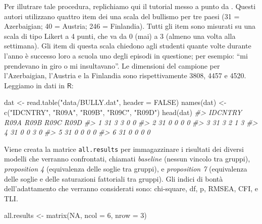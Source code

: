\documentclass[
  11pt,
]{krantz}
\makeatletter
\newenvironment{Shaded}{\begin{snugshade}}{\end{snugshade}}
\newcommand{\AttributeTok}[1]{\textcolor[rgb]{0.61,0.61,0.61}{#1}}
\newcommand{\CommentTok}[1]{\textcolor[rgb]{0.37,0.37,0.37}{\textit{#1}}}
\newcommand{\ConstantTok}[1]{\textcolor[rgb]{0,0,0}{#1}}
\newcommand{\DecValTok}[1]{\textcolor[rgb]{0.06,0.06,0.06}{#1}}
\newcommand{\FunctionTok}[1]{\textcolor[rgb]{0,0,0}{#1}}
\newcommand{\NormalTok}[1]{#1}
\newcommand{\OtherTok}[1]{\textcolor[rgb]{0.37,0.37,0.37}{#1}}
\newcommand{\StringTok}[1]{\textcolor[rgb]{0.5,0.5,0.5}{#1}}
\newenvironment{kframe}{%
\medskip{}
\setlength{\fboxsep}{.8em}
 \def\at@end@of@kframe{}%
 \ifinner\ifhmode%
  \def\at@end@of@kframe{\end{minipage}}%
  \begin{minipage}{\columnwidth}%
 \fi\fi%
 \def\FrameCommand##1{\hskip\@totalleftmargin \hskip-\fboxsep
 \colorbox{shadecolor}{##1}\hskip-\fboxsep
     \hskip-\linewidth \hskip-\@totalleftmargin \hskip\columnwidth}%
 \MakeFramed {\advance\hsize-\width
   \@totalleftmargin\z@ \linewidth\hsize
   \@setminipage}}%
 {\par\unskip\endMakeFramed%
 \at@end@of@kframe}
\renewenvironment{Shaded}{\begin{kframe}}{\end{kframe}}
\theoremstyle{definition}
\theoremstyle{definition}
\theoremstyle{definition}
\theoremstyle{definition}
\theoremstyle{remark}
\makeatother
\begin{document}
Per illutrare tale procedura, replichiamo qui il tutorial messo a punto da \citet{svetina2020multiple}. Questi autori utilizzano quattro item dei una scala del bullismo per tre paesi (31 = Azerbaigian; 40 = Austria; 246 = Finlandia). Tutti gli item sono misurati su una scala di tipo Likert a 4 punti, che va da 0 (mai) a 3 (almeno una volta alla settimana). Gli item di questa scala chiedono agli studenti quante volte durante l'anno è successo loro a scuola uno degli episodi in questione; per esempio: ``mi prendevano in giro o mi insultavano''. Le dimensioni del campione per l'Azerbaigian, l'Austria e la Finlandia sono rispettivamente 3808, 4457 e 4520. Leggiamo in dati in \(\textsf{R}\):

\begin{Shaded}
\begin{Highlighting}[]
\NormalTok{dat }\OtherTok{\textless{}{-}} \FunctionTok{read.table}\NormalTok{(}\StringTok{"data/BULLY.dat"}\NormalTok{, }\AttributeTok{header =} \ConstantTok{FALSE}\NormalTok{)}
\FunctionTok{names}\NormalTok{(dat) }\OtherTok{\textless{}{-}} \FunctionTok{c}\NormalTok{(}\StringTok{"IDCNTRY"}\NormalTok{, }\StringTok{"R09A"}\NormalTok{, }\StringTok{"R09B"}\NormalTok{, }\StringTok{"R09C"}\NormalTok{, }\StringTok{"R09D"}\NormalTok{)}
\FunctionTok{head}\NormalTok{(dat)}
\CommentTok{\#\textgreater{}   IDCNTRY R09A R09B R09C R09D}
\CommentTok{\#\textgreater{} 1      31    3    3    0    0}
\CommentTok{\#\textgreater{} 2      31    0    0    0    0}
\CommentTok{\#\textgreater{} 3      31    3    2    1    3}
\CommentTok{\#\textgreater{} 4      31    0    0    3    0}
\CommentTok{\#\textgreater{} 5      31    0    0    0    0}
\CommentTok{\#\textgreater{} 6      31    0    0    0    0}
\end{Highlighting}
\end{Shaded}

Viene creata la matrice \texttt{all.results} per immagazzinare i risultati dei diversi modelli che verranno confrontati, chiamati \emph{baseline} (nessun vincolo tra gruppi), \emph{proposition 4} (equivalenza delle soglie tra gruppi), e \emph{proposition 7} (equivalenza delle soglie e delle saturazioni fattoriali tra gruppi). Gli indici di bontà dell'adattamento che verranno considerati sono: chi-square, df, p, RMSEA, CFI, e TLI.

\begin{Shaded}
\begin{Highlighting}[]
\NormalTok{all.results }\OtherTok{\textless{}{-}} \FunctionTok{matrix}\NormalTok{(}\ConstantTok{NA}\NormalTok{, }\AttributeTok{ncol =} \DecValTok{6}\NormalTok{, }\AttributeTok{nrow =} \DecValTok{3}\NormalTok{)}
\end{Highlighting}
\end{Shaded}
\end{document}
